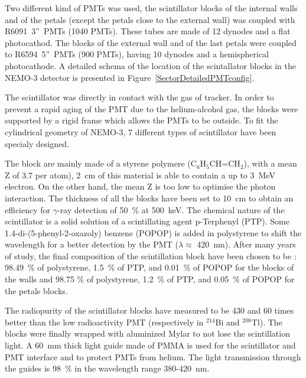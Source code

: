 \documentclass[main.tex]{subfiles}
\begin{document}
\bigskip


\NI Two different kind of PMTs was used, the scintillator blocks of the internal walls and of the petals (except the petals close to the external wall) was coupled with R6091~3''~PMTs (1040 PMTs). These tubes are made of 12 dynodes and a flat photocathod. The blocks of the external wall and of the last petals were coupled to R6594~5''~PMTs (900 PMTs), having 10 dynodes and a hemispherical photocathode. A detailed schema of the location of the scintallator blocks in the NEMO-3 detector is presented in Figure~\ref{SectorDetailedPMTconfig}.


\smallskip




\NI The scintillator was directly in contact with the gas of tracker. In order to prevent a rapid aging of the PMT due to the helium-alcohol gas, the blocks were supported by a rigid frame which allows the PMTs to be outside. To fit the cylindrical geometry of NEMO-3, 7 different types of scintillator have been specialy designed. 


\bigskip


\NI The block are mainly made of a styrene polymere (C$_\text{6}$H$_\text{5}$CH=CH$_\text{2}$), with a mean Z of 3.7 per atom), 2~cm of this material is able to contain a up to 3~MeV electron. On the other hand, the mean Z is too low to optimise the photon interaction. The thickness of all the blocks have been set to 10~cm to obtain an efficiency for $\gamma$-ray detection of 50~\% at 500~keV. The chemical nature of the scintillator is a solid solution of a scintillating agent p-Terphenyl (PTP). Some 1.4-di-(5-phenyl-2-oxazoly) benzene (POPOP) is added in polystyrene to shift the wavelength for a better detection by the PMT ($\lambda \approx$ 420~nm). After many years of study, the final composition of the scintillation block have been chosen to be : 98.49~\% of polystyrene, 1.5~\% of PTP, and 0.01~\% of POPOP for the blocks of the walls and 98.75 \% of polystyrene, 1.2~\% of PTP, and 0.05~\% of POPOP for the petals blocks.


\bigskip


\NI The radiopurity of the scintillator blocks have measured to be 430 and 60 times better than the low radioactivity PMT (respectively in $^{\text{214}}$Bi and $^{\text{208}}$Tl). The blocks were finally wrapped with aluminized Mylar to not lose the scintillation light. A 60~mm thick light guide made of PMMA is used for the scintillator and PMT interface and to protect PMTs from helium. The light transmission through the guides is 98~\% in the wavelength range 380-420~nm.
\end{document}
